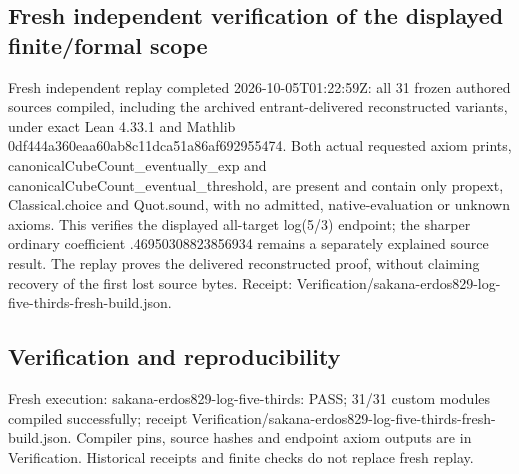 \documentclass[11pt,a4paper]{article}
\begin{document}
\subsection{Fresh independent verification of the displayed finite/formal scope}
Fresh independent replay completed 2026-10-05T01:22:59Z: all 31 frozen authored sources compiled, including the archived entrant-delivered reconstructed variants, under exact Lean 4.33.1 and Mathlib 0df444a360eaa60ab8c11dca51a86af692955474. Both actual requested axiom prints, canonicalCubeCount\_eventually\_exp and canonicalCubeCount\_eventual\_threshold, are present and contain only propext, Classical.choice and Quot.sound, with no admitted, native-evaluation or unknown axioms. This verifies the displayed all-target log(5/3) endpoint; the sharper ordinary coefficient .46950308823856934 remains a separately explained source result. The replay proves the delivered reconstructed proof, without claiming recovery of the first lost source bytes. Receipt: Verification/sakana-erdos829-log-five-thirds-fresh-build.json.

\subsection{Verification and reproducibility}
Fresh execution: sakana-erdos829-log-five-thirds: PASS; 31/31 custom modules compiled successfully; receipt Verification/sakana-erdos829-log-five-thirds-fresh-build.json. Compiler pins, source hashes and endpoint axiom outputs are in Verification. Historical receipts and finite checks do not replace fresh replay.
\end{document}

